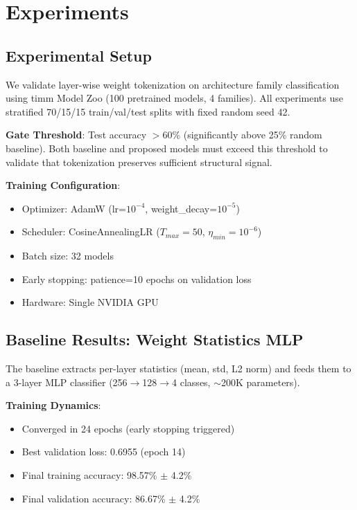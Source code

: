 \section{Experiments}

\subsection{Experimental Setup}

We validate layer-wise weight tokenization on architecture family classification using timm Model Zoo (100 pretrained models, 4 families). All experiments use stratified 70/15/15 train/val/test splits with fixed random seed 42.

\textbf{Gate Threshold}: Test accuracy $>$60\% (significantly above 25\% random baseline). Both baseline and proposed models must exceed this threshold to validate that tokenization preserves sufficient structural signal.

\textbf{Training Configuration}:
\begin{itemize}
\item Optimizer: AdamW (lr=$10^{-4}$, weight\_decay=$10^{-5}$)
\item Scheduler: CosineAnnealingLR ($T_{max}=50$, $\eta_{min}=10^{-6}$)
\item Batch size: 32 models
\item Early stopping: patience=10 epochs on validation loss
\item Hardware: Single NVIDIA GPU
\end{itemize}

\subsection{Baseline Results: Weight Statistics MLP}

The baseline extracts per-layer statistics (mean, std, L2 norm) and feeds them to a 3-layer MLP classifier (256$\rightarrow$128$\rightarrow$4 classes, $\sim$200K parameters).

\textbf{Training Dynamics}:
\begin{itemize}
\item Converged in 24 epochs (early stopping triggered)
\item Best validation loss: 0.6955 (epoch 14)
\item Final training accuracy: 98.57\% $\pm$ 4.2\%
\item Final validation accuracy: 86.67\% $\pm$ 4.2\%
\end{itemize}

